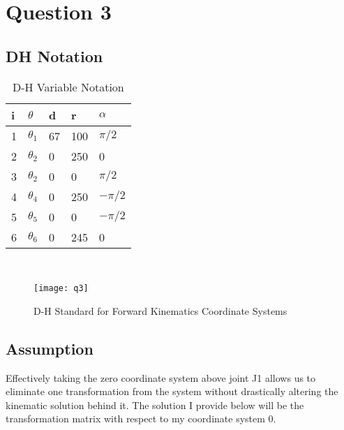 \newpage
\section{Question 3}
	\subsection*{DH Notation}
	\noindent
		\begin{table}[position = here]
		\begin{centering}
		\begin{tabular}{||l|l|l|l|l||}
			\hline \rule[-2ex]{0pt}{5.5ex} \color{red}\bf{i} & \color{red}\bf{$\theta$}		&	\color{red}\bf{d}	&	\color{red}\bf{r}	&	\color{red}\bf{$\alpha$}\\ 
			\hline \rule[-2ex]{0pt}{5.5ex} 1 & $\theta_{1}$	&	67	&	100	&	$\pi/2$	\\	
			\hline \rule[-2ex]{0pt}{5.5ex} 2 & $\theta_{2}$	&	0	&	250	&	0		\\
			\hline \rule[-2ex]{0pt}{5.5ex} 3 & $\theta_{2}$	&	0	&	0	&	$\pi/2$	\\
			\hline \rule[-2ex]{0pt}{5.5ex} 4 & $\theta_{4}$	&	0	&	250	&	$-\pi/2$ \\
			\hline \rule[-2ex]{0pt}{5.5ex} 5 & $\theta_{5}$	&	0	&	0	&	$-\pi/2$	\\
			\hline \rule[-2ex]{0pt}{5.5ex} 6 & $\theta_{6}$	&	0	&	245	&	0		\\
			\hline 
		\end{tabular}\\
		\end{centering}
		\begin{flushleft}
		\caption [DHVariables] {D-H Variable Notation}
		\end{flushleft}
		\end{table}
		
		
		\begin{figure}[position = here]
			\begin{centering}
				\texttt{[image: q3]}\\
				\caption [DHDrawing]{D-H Standard for Forward Kinematics Coordinate Systems}
			\end{centering}
		\end{figure}
		
	\pagebreak
	\subsection*{Assumption}
	Effectively taking the zero coordinate system above joint J1 allows us to eliminate one transformation from the system without drastically altering the kinematic solution behind it. The solution I provide below will be the transformation matrix with respect to my coordinate system 0.
	

